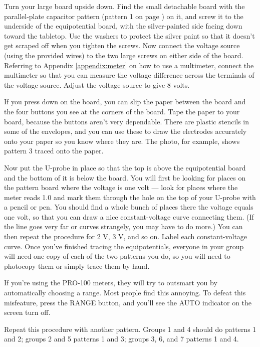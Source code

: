 Turn your large board upside down. Find the small detachable board
with the parallel-plate capacitor pattern (pattern 1 on page \pageref{em-fie-patterns}) on it, and screw
it to the underside of the equipotential board, with the
silver-painted side facing down toward the tabletop. Use the washers to
protect the silver paint so that it doesn't get scraped off when you tighten
the screws. Now connect the voltage source
(using the provided wires) to the two large screws on either
side of the board. Referring to Appendix \ref{appendix:meter} on how to use a
multimeter, connect the multimeter so that you can measure
the voltage difference across the terminals of the voltage
source. Adjust the voltage source to give 8 volts.

\label{em-fie-patterns}

If you press down on the board, you can slip the paper
between the board and the four buttons you see at the
corners of the board. Tape the paper to your board, because the buttons aren't
very dependable. There are plastic stencils in some of the envelopes,
and you can use these to draw the electrodes accurately onto your paper
so you know where they are. The photo, for example, shows pattern 3
traced onto the paper.

Now put the U-probe in place so that
the top is above the equipotential board and the bottom of
it is below the board. You will first be looking for places
on the pattern board where the voltage is one volt --- look
for places where the meter reads 1.0 and mark them through
the hole on the top of your U-probe with a pencil or pen.
You should find a whole bunch of places there the voltage
equals one volt, so that you can draw a nice constant-voltage
curve connecting them. (If the line goes very far or curves
strangely, you may have to do more.) You can then repeat the
procedure for 2 V, 3 V, and so on.  Label each
constant-voltage curve.  Once you've finished tracing the equipotentials,
everyone in your group will need one copy of each of the two
patterns you do, so you will need to photocopy them or
simply trace them by hand.

If you're using the PRO-100 meters, they will try to outsmart you by automatically
choosing a range. Most people find this annoying. To defeat this misfeature,
press the RANGE button, and you'll see the AUTO indicator on the screen turn off.

Repeat this procedure with another pattern. Groups 1 and 4 should do patterns
1 and 2; groups 2 and 5 patterns 1 and 3; groups 3, 6, and 7 patterns 1 and 4.

